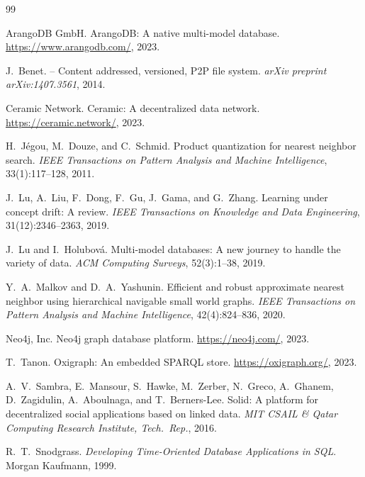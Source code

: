 \documentclass[11pt,twocolumn]{article}
\begin{document}
\begin{thebibliography}{99}

ArangoDB GmbH.
\newblock ArangoDB: A native multi-model database.
\newblock \url{https://www.arangodb.com/}, 2023.

J.~Benet.
 -- Content addressed, versioned, {P2P} file system.
\newblock \emph{arXiv preprint arXiv:1407.3561}, 2014.

Ceramic Network.
\newblock Ceramic: A decentralized data network.
\newblock \url{https://ceramic.network/}, 2023.

H.~J\'{e}gou, M.~Douze, and C.~Schmid.
\newblock Product quantization for nearest neighbor search.
\newblock \emph{IEEE Transactions on Pattern Analysis and Machine Intelligence},
  33(1):117--128, 2011.

J.~Lu, A.~Liu, F.~Dong, F.~Gu, J.~Gama, and G.~Zhang.
\newblock Learning under concept drift: A review.
\newblock \emph{IEEE Transactions on Knowledge and Data Engineering},
  31(12):2346--2363, 2019.

J.~Lu and I.~Holubov\'{a}.
\newblock Multi-model databases: A new journey to handle the variety of data.
\newblock \emph{ACM Computing Surveys}, 52(3):1--38, 2019.

Y.~A.~Malkov and D.~A.~Yashunin.
\newblock Efficient and robust approximate nearest neighbor using hierarchical
  navigable small world graphs.
\newblock \emph{IEEE Transactions on Pattern Analysis and Machine Intelligence},
  42(4):824--836, 2020.

Neo4j, Inc.
\newblock Neo4j graph database platform.
\newblock \url{https://neo4j.com/}, 2023.

T.~Tanon.
\newblock Oxigraph: An embedded {SPARQL} store.
\newblock \url{https://oxigraph.org/}, 2023.

A.~V.~Sambra, E.~Mansour, S.~Hawke, M.~Zerber, N.~Greco, A.~Ghanem,
  D.~Zagidulin, A.~Aboulnaga, and T.~Berners-Lee.
\newblock Solid: A platform for decentralized social applications based on
  linked data.
\newblock \emph{MIT CSAIL \& Qatar Computing Research Institute, Tech.\ Rep.},
  2016.

R.~T.~Snodgrass.
\newblock \emph{Developing Time-Oriented Database Applications in {SQL}}.
\newblock Morgan Kaufmann, 1999.


\end{thebibliography}
\end{document}
